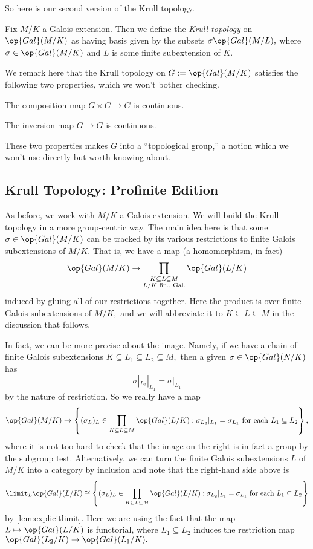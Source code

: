 So here is our second version of the Krull topology.
\begin{defi}
	Fix $M/K$ a Galois extension. Then we define the \textit{Krull topology} on $\op{Gal}(M/K)$ as having basis given by the subsets $\sigma\op{Gal}(M/L),$ where $\sigma\in\op{Gal}(M/K)$ and $L$ is some finite {sub}extension of $K.$
\end{defi}
\begin{remark}
	We remark here that the Krull topology on $G:=\op{Gal}(M/K)$ satisfies the following two properties, which we won't bother checking.
	\begin{listalph}
		\item The composition map $G\times G\to G$ is continuous.
		\item The inversion map $G\to G$ is continuous.
	\end{listalph}
	These two properties makes $G$ into a ``topological group,'' a notion which we won't use directly but worth knowing about.
\end{remark}

\subsection{Krull Topology: Profinite Edition}
As before, we work with $M/K$ a Galois extension. We will build the Krull topology in a more group-centric way. The main idea here is that some $\sigma\in\op{Gal}(M/K)$ can be tracked by its various restrictions to finite Galois {sub}extensions of $M/K.$ That is, we have a map (a homomorphism, in fact)
\[\op{Gal}(M/K)\to\prod_{\substack{K\subseteq L\subseteq M\\L/K\text{ fin., Gal.}}}\op{Gal}(L/K)\]
induced by gluing all of our restrictions together. Here the product is over finite Galois {sub}extensions of $M/K,$ and we will abbreviate it to $K\subseteq L\subseteq M$ in the discussion that follows.

In fact, we can be more precise about the image. Namely, if we have a chain of finite Galois {sub}extensions $K\subseteq L_1\subseteq L_2\subseteq M,$ then a given $\sigma\in\op{Gal}(N/K)$ has
\[\sigma|_{L_2}|_{L_1}=\sigma|_{L_1}\]
by the nature of restriction. So we really have a map
\[\op{Gal}(M/K)\to\left\{(\sigma_L)_L\in\prod_{K\subseteq L\subseteq M}\op{Gal}(L/K):\sigma_{L_2}|_{L_1}=\sigma_{L_1}\text{ for each }L_1\subseteq L_2\right\},\]
where it is not too hard to check that the image on the right is in fact a group by the subgroup test. Alternatively, we can turn the finite Galois subextensions $L$ of $M/K$ into a category by inclusion and note that the right-hand side above is
\[\limit_L\op{Gal}(L/K)\cong\left\{(\sigma_L)_L\in\prod_{K\subseteq L\subseteq M}\op{Gal}(L/K):\sigma_{L_2}|_{L_1}=\sigma_{L_1}\text{ for each }L_1\subseteq L_2\right\}\]
by \autoref{lem:explicitlimit}. Here we are using the fact that the map $L\mapsto\op{Gal}(L/K)$ is functorial, where $L_1\subseteq L_2$ induces the restriction map $\op{Gal}(L_2/K)\to\op{Gal}(L_1/K).$


